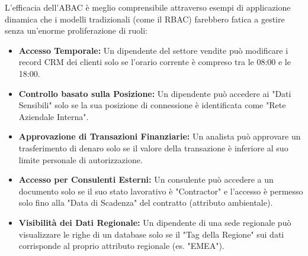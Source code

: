 \documentclass{article}
\begin{document}
L'efficacia dell'ABAC è meglio comprensibile attraverso esempi di applicazione dinamica che i modelli tradizionali (come il RBAC) farebbero fatica a gestire senza un'enorme proliferazione di ruoli:

\begin{itemize}
    \item \textbf{Accesso Temporale:} Un dipendente del settore vendite può modificare i record CRM dei clienti solo se l'orario corrente è compreso tra le 08:00 e le 18:00.
    \item \textbf{Controllo basato sulla Posizione:} Un dipendente può accedere ai "Dati Sensibili" solo se la sua posizione di connessione è identificata come "Rete Aziendale Interna".
    \item \textbf{Approvazione di Transazioni Finanziarie:} Un analista può approvare un trasferimento di denaro solo se il valore della transazione è inferiore al suo limite personale di autorizzazione.
    \item \textbf{Accesso per Consulenti Esterni:} Un consulente può accedere a un documento solo se il suo stato lavorativo è "Contractor" e l'accesso è permesso solo fino alla "Data di Scadenza" del contratto (attributo ambientale).
    \item \textbf{Visibilità dei Dati Regionale:} Un dipendente di una sede regionale può visualizzare le righe di un database solo se il "Tag della Regione" sui dati corrisponde al proprio attributo regionale (es. "EMEA").
\end{itemize}
\end{document}
